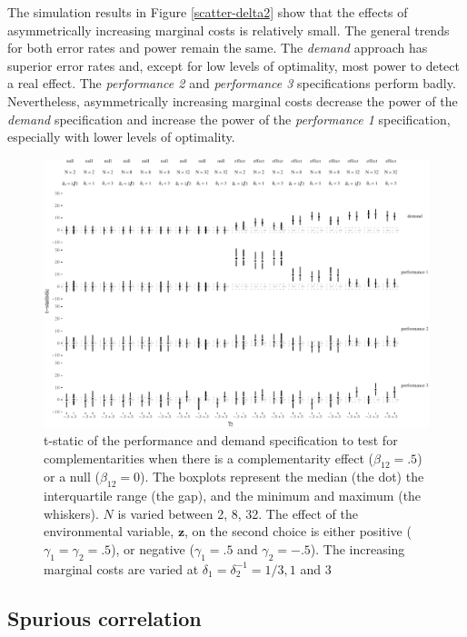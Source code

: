 \documentclass[12pt]{article}
\begin{document}
The simulation results in Figure \ref{scatter-delta2} show that the
effects of asymmetrically increasing marginal costs is relatively small.
The general trends for both error rates and power remain the same. The
\emph{demand} approach has superior error rates and, except for low
levels of optimality, most power to detect a real effect. The
\emph{performance 2} and \emph{performance 3} specifications perform
badly. Nevertheless, asymmetrically increasing marginal costs decrease
the power of the \emph{demand} specification and increase the power of
the \emph{performance 1} specification, especially with lower levels of
optimality.

\begin{figure}

\includegraphics[width=500px]{figure-latex/unnamed-chunk-10-1}
\caption[Error Rate and Power with Asymmetric with Marginal Costs]
{\label{delta2} t-static of the performance and demand specification to test
for complementarities when there is a complementarity effect ($\beta_{12} = .5$)
or a null ($\beta_{12} = 0$). The boxplots represent the median (the dot) the
interquartile range (the gap), and the minimum and maximum (the whiskers). $N$
is varied between 2, 8, 32. The effect of the environmental
variable, $\mathbf{z}$, on the second choice is either positive
($\gamma_1 = \gamma_2 = .5$), or
negative ($\gamma_1 = .5$ and $\gamma_2 = -.5$). The increasing marginal costs
are varied at $\delta_1 = \delta_2^{-1} = 1/3, 1$ and $3$}
\end{figure}

\subsection{Spurious correlation}\label{spurious-correlation}
\end{document}

